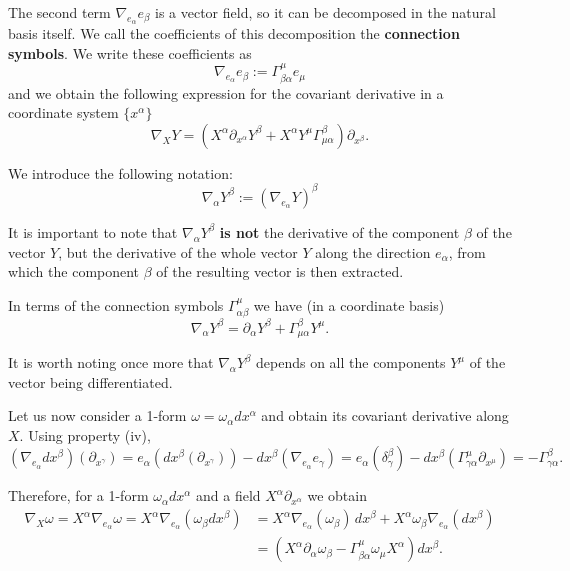 \begin{points}
\item The second term $\nabla_{e_\alpha}e_\beta$ is a vector field, so it can be decomposed in the natural basis itself. We call the coefficients of this decomposition the \textbf{connection symbols}. We write these coefficients as
\[
  \nabla_{e_\alpha}e_\beta:=\Gamma^\mu_{\beta\alpha}e_\mu
\]
and we obtain the following expression for the covariant derivative in a coordinate system $\{x^\alpha\}$
\[
  \nabla_XY=\left(X^\alpha\partial_{x^\alpha}Y^\beta+X^\alpha Y^\mu\Gamma^\beta_{\mu\alpha}\right)\partial_{x^\beta}.
\]

\item We introduce the following notation:
\[
  \nabla_\alpha Y^\beta:=\left(\nabla_{e_\alpha}Y\right)^\beta
\]

\item It is important to note that $\nabla_\alpha Y^\beta$ \textbf{is not} the derivative of the component $\beta$ of the vector $Y$, but the derivative of the whole vector $Y$ along the direction $e_\alpha$, from which the component $\beta$ of the resulting vector is then extracted.

\item In terms of the connection symbols $\Gamma^\mu_{\alpha\beta}$ we have (in a coordinate basis)
\[
  \nabla_\alpha Y^\beta=\partial_\alpha Y^\beta+\Gamma^\beta_{\mu\alpha}Y^\mu .
\]

\item It is worth noting once more that $\nabla_\alpha Y^\beta$ depends on all the components $Y^\mu$ of the vector being differentiated.

\item Let us now consider a 1-form $\omega=\omega_\alpha dx^\alpha$ and obtain its covariant derivative along $X$. Using property (iv),
\[
  (\nabla_{e_\alpha}dx^\beta)(\partial_{x^\gamma})=e_\alpha\left(dx^\beta(\partial_{x^\gamma})\right)-dx^\beta\left(\nabla_{e_\alpha}e_\gamma\right)=e_\alpha(\delta^\beta_\gamma)-dx^\beta\left(\Gamma^\mu_{\gamma\alpha}\partial_{x^\mu}\right)=-\Gamma^\beta_{\gamma\alpha}.
\]

\item Therefore, for a 1-form $\omega_\alpha dx^\alpha$ and a field $X^\alpha\partial_{x^\alpha}$ we obtain
\begin{align*}
  \nabla_X\omega=X^\alpha\nabla_{e_\alpha}\omega=X^\alpha\nabla_{e_\alpha}\left(\omega_\beta dx^\beta\right)&=X^\alpha\nabla_{e_\alpha}(\omega_\beta)\,dx^\beta+X^\alpha\omega_\beta\nabla_{e_\alpha}(dx^\beta)\\
  &=\left(X^\alpha\partial_\alpha\omega_\beta-\Gamma^\mu_{\beta\alpha}\omega_\mu X^\alpha\right)dx^\beta .
\end{align*}


\end{points}

